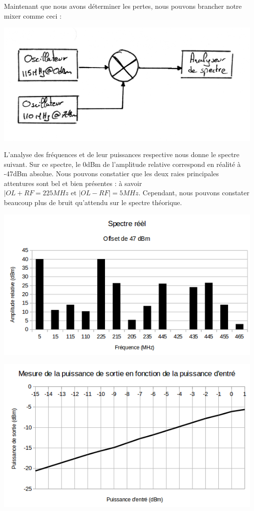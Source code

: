 \documentclass[a4paper,12pt]{report}            %
\begin{document}
    Maintenant que nous avons déterminer les pertes, nous pouvons brancher notre mixer
comme ceci :
\begin{center}\includegraphics[scale = 0.2]{pic/cablage.png}\\ \end{center}


    L'analyse des fréquences et de leur puissances respective nous donne le spectre suivant.
Sur ce spectre, le 0dBm de l'amplitude relative correspond en réalité à -47dBm absolue. Nous 
pouvons constatier que les deux raies principales attentures sont bel et bien présentes :
à savoir $|OL+RF = 225 MHz \mbox{ et } |OL-RF| = 5 MHz$. Cependant, nous pouvons constater 
beaucoup plus de bruit qu'attendu sur le spectre théorique.
\begin{center}\includegraphics[scale = 0.7]{pic/spectre_reel.png}\\ \end{center}
\begin{center}\includegraphics[scale = 0.7]{pic/graph_pout.png}\\ \end{center}
\end{document}

